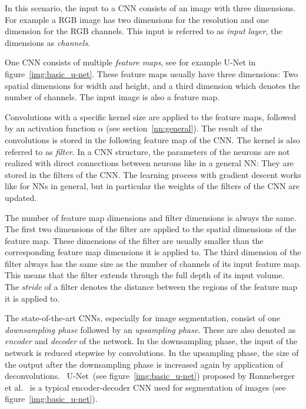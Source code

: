 In this scenario, the input to a CNN consists of an image with three dimensions. For example a RGB image has two dimensions for the resolution and one dimension for the RGB channels. This input is referred to as \emph{input layer}, the dimensions as \emph{channels}.

One CNN consists of multiple \emph{feature maps}, see for example U-Net in figure~\ref{img:basic_u-net}.
These feature maps usually have three dimensions: Two spatial dimensions for width and height, and a third dimension which denotes the number of channels. The input image is also a feature map.

Convolutions with a specific kernel size are applied to the feature maps, followed by an activation function $\alpha$ (see section~\ref{nn:general}). The result of the convolutions is stored in the following feature map of the CNN. The kernel is also referred to as \emph{filter}.
In a CNN structure, the parameters of the neurons are not realized with direct connections between neurons like in a general NN: They are stored in the filters of the CNN.
The learning process with gradient descent works like for NNs in general, but in particular the weights of the filters of the CNN are updated.

The number of feature map dimensions and filter dimensions is always the same.
The first two dimensions of the filter are applied to the spatial dimensions of the feature map. These dimensions of the filter are usually smaller than the corresponding feature map dimensions it is applied to. 
The third dimension of the filter always has the same size as the number of channels of its input feature map. This means that the filter extends through the full depth of its input volume.~\cite{lecun1990handwritten_digit_recog} 
The \emph{stride} of a filter denotes the distance between the regions of the feature map it is applied to.

The state-of-the-art CNNs, especially for image segmentation, consist of one \emph{downsampling phase} followed by an \emph{upsampling phase}. These are also denoted as \emph{encoder} and \emph{decoder} of the network.
In the downsampling phase, the input of the network is reduced stepwise by convolutions. %
In the upsampling phase, the size of the output after the downsampling phase is increased again by application of deconvolutions.~\cite{Shvets2018, du2018_2D_pose_est_CNN} 
U-Net~(see figure~\ref{img:basic_u-net}) proposed by Ronneberger et al.~\cite{Ronneberger2015} is a typical encoder-decoder CNN used for segmentation of images (see figure~\ref{img:basic_u-net}). 

